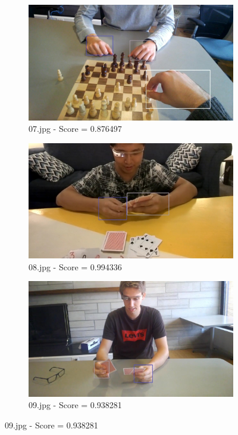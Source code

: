 \begin{figure}[!h]
\begin{subfigure}[b]{0.3\textwidth}
    \end{subfigure}
       
    \begin{subfigure}[b]{0.3 \textwidth}
        \centering
        \includegraphics[width=\textwidth]{images/handDetection/07.jpg}
        \caption{07.jpg - Score = 0.876497}
        
    \end{subfigure}
    \hfill
    \begin{subfigure}[b]{0.3\textwidth}
        \centering
        \includegraphics[width=\textwidth]{images/handDetection/08.jpg}
        \caption{08.jpg - Score = 0.994336}
       
    \end{subfigure}
    \hfill
    \begin{subfigure}[b]{0.3\textwidth}
        \centering
        \includegraphics[width=\textwidth]{images/handDetection/09.jpg}
        \caption{09.jpg - Score = 0.938281}
        

\end{subfigure}
\end{figure}
